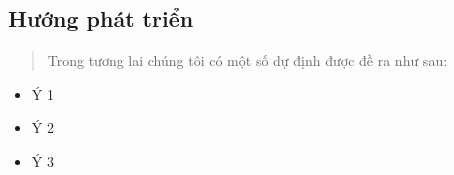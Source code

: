 \subsection{Hướng phát triển}\label{hux1b0ux1edbng-phuxe1t-triux1ec3n}

\begin{quote}
Trong tương lai chúng tôi có một số dự định được đề ra như sau:
\end{quote}

\begin{itemize}
\item
  Ý 1
\item
  Ý 2
\item
  Ý 3
\end{itemize}
